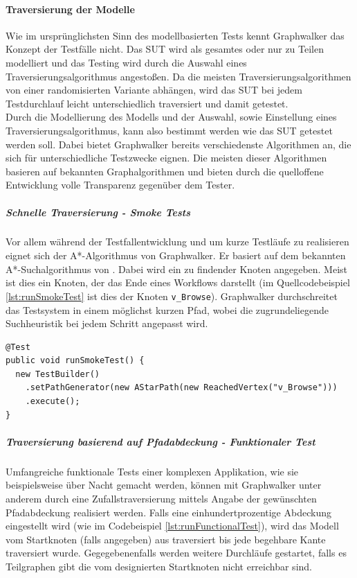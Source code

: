 
\paragraph{Traversierung der Modelle} 
\label{sec:graphwalker_traversierung} 
Wie im ursprünglichsten Sinn des modellbasierten Tests kennt Graphwalker das Konzept der Testfälle nicht. Das \Gls{SUT} wird als gesamtes oder nur zu Teilen modelliert und das Testing wird durch die Auswahl eines Traversierungsalgorithmus angestoßen. Da die meisten Traversierungsalgorithmen von einer randomisierten Variante abhängen, wird das \Gls{SUT} bei jedem Testdurchlauf leicht unterschiedlich traversiert und damit getestet.\\
Durch die Modellierung des Modells und der Auswahl, sowie Einstellung eines Traversierungsalgorithmus, kann also bestimmt werden wie das \Gls{SUT} getestet werden soll. Dabei bietet Graphwalker bereits verschiedenste Algorithmen an, die sich für unterschiedliche Testzwecke eignen. Die meisten dieser Algorithmen basieren auf bekannten Graphalgorithmen und bieten durch die quelloffene Entwicklung volle Transparenz gegenüber dem Tester.

\subparagraph{Schnelle Traversierung - Smoke Tests}
Vor allem während der Testfallentwicklung und um kurze Testläufe zu realisieren eignet sich der A*-Algorithmus von Graphwalker. Er basiert auf dem bekannten A*-Suchalgorithmus von \citeauthor{hart_formal_1968} \cite{hart_formal_1968}. Dabei wird ein zu findender Knoten angegeben. Meist ist dies ein Knoten, der das Ende eines Workflows darstellt (im Quellcodebeispiel \ref{lst:runSmokeTest} ist dies der Knoten \texttt{v\_Browse}). Graphwalker durchschreitet das Testsystem in einem möglichst kurzen Pfad, wobei die zugrundeliegende Suchheuristik bei jedem Schritt angepasst wird.

\begin{lstlisting}[caption={Initialisierung eines Graphwalker Tests basierend auf dem A*-Suchalgorithmus.}, label=lst:runSmokeTest]
@Test
public void runSmokeTest() {
  new TestBuilder()
    .setPathGenerator(new AStarPath(new ReachedVertex("v_Browse")))
    .execute();
}
\end{lstlisting}

\subparagraph{Traversierung basierend auf Pfadabdeckung - Funktionaler Test}
Umfangreiche funktionale Tests einer komplexen Applikation, wie sie beispielsweise über Nacht gemacht werden, können mit Graphwalker unter anderem durch eine Zufallstraversierung mittels Angabe der gewünschten Pfadabdeckung realisiert werden. Falls eine einhundertprozentige Abdeckung eingestellt wird (wie im Codebeispiel \ref{lst:runFunctionalTest}), wird das Modell vom Startknoten (falls angegeben) aus traversiert bis jede begehbare Kante traversiert wurde. Gegegebenenfalls werden weitere Durchläufe gestartet, falls es Teilgraphen gibt die vom designierten Startknoten nicht erreichbar sind. 

